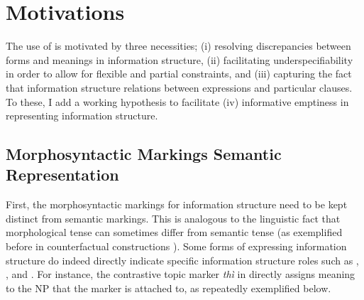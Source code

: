 \section{Motivations}
\label{9:sec:motivations}

The use of  is motivated by three necessities; (i)
resolving discrepancies between forms and meanings in information
structure, (ii) facilitating underspecifiability in order to allow for
flexible and partial constraints, and (iii) capturing the fact that
information structure relations between expressions and particular
clauses.  To these, I add a working hypothesis to facilitate (iv)
informative emptiness in representing information structure.



\subsection{Morphosyntactic Markings \vs Semantic Representation}
\label{9:ssec:ms-vs-sr}

First, the morphosyntactic markings for information structure need to
be kept distinct from semantic markings. This is analogous to the
linguistic fact that morphological tense can sometimes differ from
semantic tense (as exemplified before in counterfactual
constructions ). Some forms of expressing
information structure do indeed directly indicate specific information
structure roles such as , , and . For instance, the
contrastive topic marker \textit{th{\`i}} in  directly
assigns  meaning to the NP that the marker is
attached to, as repeatedly exemplified below.


